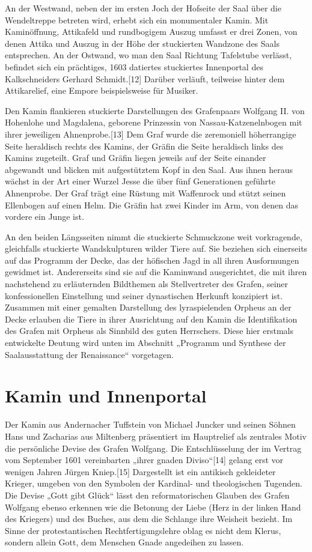 \documentclass[
  a4paper,
  openany]{book}
\begin{document}
An der Westwand, neben der im ersten Joch der Hofseite der Saal über die
Wendeltreppe betreten wird, erhebt sich ein monumentaler Kamin. Mit
Kaminöffnung, Attikafeld und rundbogigem Auszug umfasst er drei Zonen,
von denen Attika und Auszug in der Höhe der stuckierten Wandzone des
Saals entsprechen. An der Ostwand, wo man den Saal Richtung Tafelstube
verlässt, befindet sich ein prächtiges, 1603 datiertes stuckiertes
Innenportal des Kalkschneiders Gerhard Schmidt.{[}12{]} Darüber
verläuft, teilweise hinter dem Attikarelief, eine Empore beispielsweise
für Musiker.

Den Kamin flankieren stuckierte Darstellungen des Grafenpaars Wolfgang
II. von Hohenlohe und Magdalena, geborene Prinzessin von
Nassau-Katzenelnbogen mit ihrer jeweiligen Ahnenprobe.{[}13{]} Dem Graf
wurde die zeremoniell höherrangige Seite heraldisch rechts des Kamins,
der Gräfin die Seite heraldisch links des Kamins zugeteilt. Graf und
Gräfin liegen jeweils auf der Seite einander abgewandt und blicken mit
aufgestütztem Kopf in den Saal. Aus ihnen heraus wächst in der Art einer
Wurzel Jesse die über fünf Generationen geführte Ahnenprobe. Der Graf
trägt eine Rüstung mit Waffenrock und stützt seinen Ellenbogen auf einen
Helm. Die Gräfin hat zwei Kinder im Arm, von denen das vordere ein Junge
ist.

An den beiden Längsseiten nimmt die stuckierte Schmuckzone weit
vorkragende, gleichfalls stuckierte Wandskulpturen wilder Tiere auf. Sie
beziehen sich einerseits auf das Programm der Decke, das der höfischen
Jagd in all ihren Ausformungen gewidmet ist. Andererseits sind sie auf
die Kaminwand ausgerichtet, die mit ihren nachstehend zu erläuternden
Bildthemen als Stellvertreter des Grafen, seiner konfessionellen
Einstellung und seiner dynastischen Herkunft konzipiert ist. Zusammen
mit einer gemalten Darstellung des lyraspielenden Orpheus an der Decke
erlauben die Tiere in ihrer Ausrichtung auf den Kamin die Identifikation
des Grafen mit Orpheus als Sinnbild des guten Herrschers. Diese hier
erstmals entwickelte Deutung wird unten im Abschnitt „Programm und
Synthese der Saalausstattung der Renaissance`` vorgetagen.

\section{Kamin und Innenportal}\label{kamin-und-innenportal}

Der Kamin aus Andernacher Tuffstein von Michael Juncker und seinen
Söhnen Hans und Zacharias aus Miltenberg präsentiert im Hauptrelief als
zentrales Motiv die persönliche Devise des Grafen Wolfgang. Die
Entschlüsselung der im Vertrag vom September 1601 vereinbarten „ihrer
gnaden Diviso``{[}14{]} gelang erst vor wenigen Jahren Jürgen
Kniep.{[}15{]} Dargestellt ist ein antikisch gekleideter Krieger,
umgeben von den Symbolen der Kardinal- und theologischen Tugenden. Die
Devise „Gott gibt Glück`` lässt den reformatorischen Glauben des Grafen
Wolfgang ebenso erkennen wie die Betonung der Liebe (Herz in der linken
Hand des Kriegers) und des Buches, aus dem die Schlange ihre Weisheit
bezieht. Im Sinne der protestantischen Rechtfertigungslehre oblag es
nicht dem Klerus, sondern allein Gott, dem Menschen Gnade angedeihen zu
lassen.
\end{document}

